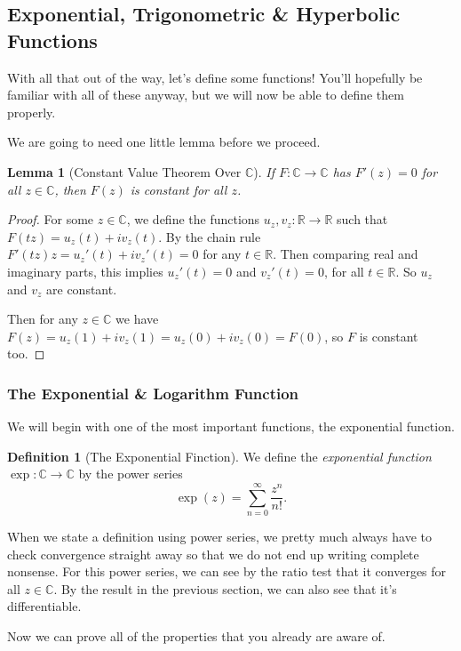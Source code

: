 \documentclass[11pt, a4paper]{article}
\newtheorem{lemma}[theorem]{Lemma}
\theoremstyle{definition}
\newtheorem{definition}[theorem]{Definition}
\newcommand{\vocab}[1]{\emph{#1}} %
\newcommand{\C}{\mathbb{C}}
\newcommand{\R}{\mathbb{R}}
\begin{document}
\subsection{Exponential, Trigonometric \& Hyperbolic Functions}

With all that out of the way, let's define some functions! You'll hopefully be familiar with all of these anyway, but we will now be able to define them properly.

We are going to need one little lemma before we proceed.

\begin{lemma}[Constant Value Theorem Over $\C$]
	If $F: \C \rightarrow \C$ has $F'(z) = 0$ for all $z \in \C$, then $F(z)$ is constant for all $z$.
\end{lemma}
\begin{proof}
	For some $z \in \C$, we define the functions $u_z, v_z : \R \rightarrow \R$ such that 
	$F(tz) = u_z(t) + i v_z(t)$.  By the chain rule $F'(tz) z = u_z'(t) + iv_z'(t) = 0$ for any $t \in \R$.	
	Then comparing real and imaginary parts, this implies $u_z'(t) = 0$ and $v_z'(t) = 0$, for all $t \in \R$.  So $u_z$ and $v_z$ are constant.

	Then for any $z \in \C$ we have $F(z) = u_z(1) + i v_z(1) = u_z(0) + i v_z(0) = F(0)$, so $F$ is constant too.
\end{proof}

\subsubsection{The Exponential \& Logarithm Function}

We will begin with one of the most important functions, the exponential function.

\begin{definition}[The Exponential Finction]
	We define the \vocab{exponential function} $\exp: \C \rightarrow \C$ by the power series
	$$
	\exp(z) = \sum_{n = 0}^{\infty} \frac{z^n}{n!}.
	$$
\end{definition}

When we state a definition using power series, we pretty much always have to check convergence straight away so that we do not end up writing complete nonsense.
For this power series, we can see by the ratio test that it converges for all $z \in \C$. By the result in the previous section, we can also see that it's differentiable.

Now we can prove all of the properties that you already are aware of.
\end{document}
